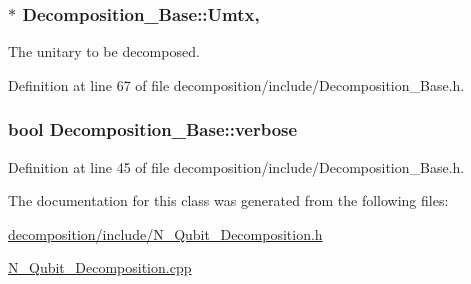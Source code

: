 \subsubsection[{\texorpdfstring{Umtx}{Umtx}}]{ $\ast$ Decomposition\+\_\+\+Base\+::\+Umtx\hspace{0.3cm}{\ttfamily [protected]}, {\ttfamily [inherited]}}\hypertarget{class_decomposition___base_a61a784aaba39276260b3f73709b51ccc}{}\label{class_decomposition___base_a61a784aaba39276260b3f73709b51ccc}


The unitary to be decomposed. 



Definition at line 67 of file decomposition/include/\+Decomposition\+\_\+\+Base.\+h.

\subsubsection[{\texorpdfstring{verbose}{verbose}}]{\setlength{\rightskip}{0pt plus 5cm}bool Decomposition\+\_\+\+Base\+::verbose\hspace{0.3cm}{\ttfamily [inherited]}}\hypertarget{class_decomposition___base_a0636a9e49a19f7167b7abdf309882042}{}\label{class_decomposition___base_a0636a9e49a19f7167b7abdf309882042}


Definition at line 45 of file decomposition/include/\+Decomposition\+\_\+\+Base.\+h.



The documentation for this class was generated from the following files\+:\begin{DoxyCompactItemize}
\item 
\hyperlink{decomposition_2include_2_n___qubit___decomposition_8h}{decomposition/include/\+N\+\_\+\+Qubit\+\_\+\+Decomposition.\+h}\item 
\hyperlink{_n___qubit___decomposition_8cpp}{N\+\_\+\+Qubit\+\_\+\+Decomposition.\+cpp}\end{DoxyCompactItemize}
